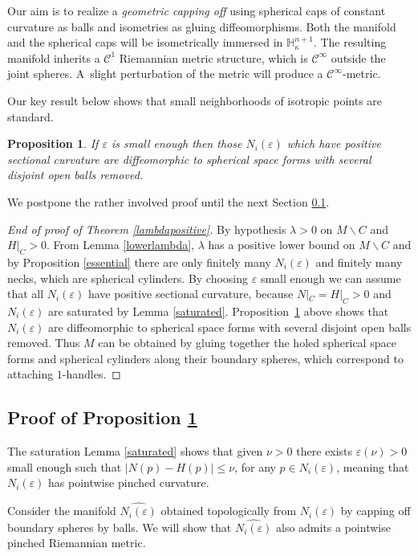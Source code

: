 \documentclass[10pt]{amsart}
\let\mathcal\mathscr
\let\moins\smallsetminus
\let\epsilon\varepsilon
\newtheorem{proposition}[theorem]{Proposition}
\theoremstyle{definition}
\theoremstyle{remark}
\numberwithin{equation}{section}
\begin{document}
Our aim is to realize a \emph{geometric capping off} using spherical caps of constant curvature as balls and
isometries as gluing diffeomorphisms. Both the manifold and the spherical caps will be isometrically immersed in
$\mathbb H_{\kappa}^{n+1}$. The resulting manifold inherits a $\mathcal C^1$ Riemannian metric structure, which is
$\mathcal C^{\infty}$ outside the joint spheres. A~slight perturbation of the metric will produce a $\mathcal C^{\infty}$-metric.

Our key result below shows that small neighborhoods of isotropic points
are standard.

\begin{proposition}\label{isotrop}
If $\varepsilon$ is small enough
then those $N_i(\varepsilon)$ which have positive sectional curvature are
diffeomorphic to spherical space forms with several disjoint open balls
removed.
\end{proposition}
We postpone the rather involved proof until the next Section \ref{isotrop-proof}.

\begin{proof}[End of proof of Theorem \ref{lambdapositive}]
By hypothesis $\lambda >0$ on $M\moins C$ and $H|_C >0$. From
Lemma \ref{lowerlambda}, $\lambda$ has a positive lower bound on $M\moins C$ and
by Proposition \ref{essential} there are only finitely many $N_i(\varepsilon)$ and finitely many necks, which are spherical cylinders.
By choosing $\varepsilon$ small enough we can assume that all $N_i(\varepsilon)$ have positive sectional
curvature, because $N|_C=H|_C>0$ and $N_i(\varepsilon)$ are saturated by Lemma \ref{saturated}. Proposition~\ref{isotrop} above shows that
$N_i(\varepsilon)$ are diffeomorphic to spherical space forms with several disjoint open balls removed.
Thus $M$ can be obtained by gluing together the holed spherical space forms and spherical cylinders along
their boundary spheres, which correspond to attaching $1$\nobreakdash-handles.
\end{proof}


\subsection{Proof of Proposition \ref{isotrop}}\label{isotrop-proof}
The saturation Lemma \ref{saturated} shows that
given $\nu>0$ there exists $\epsilon(\nu) >0$ small enough such that
$|N(p)-H(p)| \leq \nu $, for any $p\in N_i(\varepsilon)$, meaning that
$N_i(\varepsilon)$ has pointwise pinched curvature.

Consider the manifold $\widehat{N_i(\varepsilon)}$ obtained
topologically from $N_i(\varepsilon)$ by capping off boundary spheres by balls. We will show
that $\widehat{N_i(\varepsilon)}$ also admits a pointwise pinched Riemannian metric.
\end{document}
